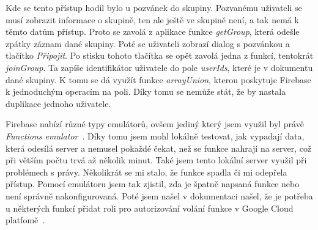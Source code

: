 Kde se tento přístup hodil bylo u pozvánek do skupiny. Pozvanému uživateli se musí zobrazit informace o skupině, ten ale ještě ve skupině není,
a tak nemá k těmto datům přístup. Proto se zavolá z aplikace funkce \emph{getGroup}, která odešle zpátky záznam dané skupiny. Poté se uživateli
zobrazí dialog s pozvánkou a tlačítko \emph{Připojit}. Po stisku tohoto tlačítka se opět zavolá jedna z funkcí, tentokrát \emph{joinGroup}. Ta
zapíše identifikátor uživatele do pole \emph{userIds}, které je v dokumentu dané skupiny. K tomu se dá využít funkce \emph{arrayUnion}, kterou poskytuje
Firebase k jednoduchým operacím na poli. Díky tomu se nemůže stát, že by nastala duplikace jednoho uživatele.

Firebase nabízí různé typy emulátorů, ovšem jediný který jsem využil byl právě \emph{Functions emulator}~\cite{FirebaseEmulator}. Díky tomu jsem mohl lokálně testovat, jak vypadají
data, která odesílá server a nemusel pokaždé čekat, než se funkce nahrají na server, což při větším počtu trvá až několik minut. Také jsem tento lokální server
využil při problémech s právy. Několikrát se mi stalo, že funkce spadla či mi odepřela přístup. Pomocí emulátoru jsem tak zjistil, zda je špatně napsaná funkce
nebo není správně nakonfigurovaná. Poté jsem našel v dokumentaci našel, že je potřeba u některých funkcí přidat roli pro autorizování volání funkce v Google
Cloud platfomě~\cite{CloudRights}.


